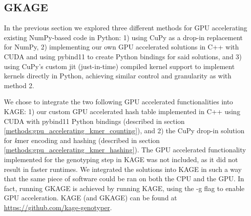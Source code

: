 \subsection{GKAGE} \label{results:gkage}
In the previous section we explored three different methods for GPU accelerating existing NumPy-based code in Python: 
1) using CuPy as a drop-in replacement for NumPy,
2) implementing our own GPU accelerated solutions in C++ with CUDA and using pybind11 to create Python bindings for said solutions, 
and 3) using CuPy's custom jit (just-in-time) compiled kernel support to implement kernels directly in Python, achieving similar control and granularity as with method 2.

We chose to integrate the two following GPU accelerated functionalities into KAGE:
1) our custom GPU accelerated hash table implemented in C++ using CUDA with pybind11 Python bindings (described in section \ref{methods:gpu_accelerating_kmer_counting}), and
2) the CuPy drop-in solution for \textit{k}mer encoding and hashing (described in section \ref{methods:gpu_accelerating_kmer_hashing}).
The GPU accelerated functionality implemented for the genotyping step in KAGE was not included, as it did not result in faster runtimes.
We integrated the solutions into KAGE in such a way that the same piece of software could be ran on both the CPU and the GPU.
In fact, running GKAGE is achieved by running KAGE, using the -g flag to enable GPU acceleration.
KAGE (and GKAGE) can be found at \url{https://github.com/kage-genotyper}.

